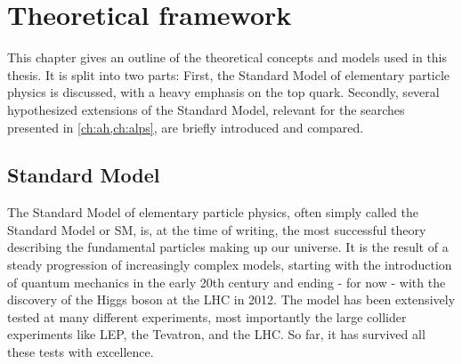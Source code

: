 \chapter{Theoretical framework}
\label{ch:theory}

This chapter gives an outline of the theoretical concepts and models used in this thesis. It is split into two parts: First, the Standard Model of elementary particle physics is discussed, with a heavy emphasis on the top quark. Secondly, several hypothesized extensions of the Standard Model, relevant for the searches presented in \cref{ch:ah,ch:alps}, are briefly introduced and compared.

\section{Standard Model}


The Standard Model of elementary particle physics, often simply called the Standard Model or SM, is, at the time of writing, the most successful theory describing the fundamental particles making up our universe. It is the result of a steady progression of increasingly complex models, starting with the introduction of quantum mechanics in the early 20th century and ending - for now - with the discovery of the Higgs boson at the LHC in 2012. The model has been extensively tested at many different experiments, most importantly the large collider experiments like LEP, the Tevatron, and the LHC. So far, it has survived all these tests with excellence.

